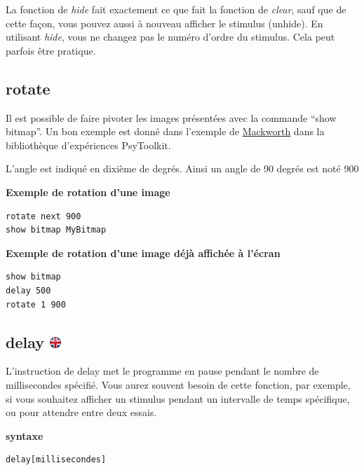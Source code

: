 \documentclass[
]{book}
\begin{document}
La fonction de \emph{hide} fait exactement ce que fait la fonction de \emph{clear}, sauf que de cette façon, vous pouvez aussi à nouveau afficher le stimulus (unhide). En utilisant \emph{hide}, vous ne changez pas le numéro d'ordre du stimulus. Cela peut parfois être pratique.

\hypertarget{rotate}{%
\subsection{rotate}\label{rotate}}

Il est possible de faire pivoter les images présentées avec la commande ``show bitmap''. Un bon exemple est donné dans l'exemple de \href{http://www.psytoolkit.org/experiment-library/mackworth.html}{Mackworth} dans la bibliothèque d'expériences PsyToolkit.

L'angle est indiqué en dixième de degrés. Ainsi un angle de 90 degrés est noté 900

\textbf{Exemple de rotation d'une image}

\begin{verbatim}
rotate next 900
show bitmap MyBitmap
\end{verbatim}

\textbf{Exemple de rotation d'une image déjà affichée à l'écran}

\begin{verbatim}
show bitmap
delay 500
rotate 1 900
\end{verbatim}

\hypertarget{delay}{%
\subsection[delay ]{\texorpdfstring{delay \href{https://www.psytoolkit.org/doc3.2.0/syntax.html\#task-delay}{\protect\includegraphics{img/ukflag.png}}}{delay }}\label{delay}}

L'instruction de delay met le programme en pause pendant le nombre de millisecondes spécifié. Vous aurez souvent besoin de cette fonction, par exemple, si vous souhaitez afficher un stimulus pendant un intervalle de temps spécifique, ou pour attendre entre deux essais.

\textbf{syntaxe}

\begin{verbatim}
delay[millisecondes]
\end{verbatim}
\end{document}
